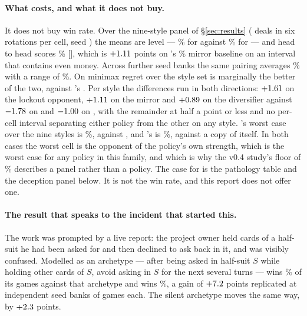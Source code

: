 \paragraph{What \vfive{} costs, and what it does not buy.} It does not buy win
rate. Over the nine-style panel of \S\ref{sec:results}
(\numStyleDeals{} deals in six rotations per cell, seed \numStyleSeed{}) the
means are level --- \numVfiveMean\% for \vfive{} against \numVfourMean\% for
\vfour{} --- and head to head \vfive{} scores \numPanelVfiveVfour\%
[\numStyleCIVfour], which is $+1.11$ points on \vfour{}'s
\numPanelVfourVfour\% mirror baseline on an interval that contains even money.
Across \numHeadSeeds{} further seed banks the same pairing averages \numHeadWin\%
with a range of \numHeadRange\%. On minimax regret over the style set \vfour{} is
marginally the better of the two, \numVfourRegret{} against \vfive{}'s
\numVfiveRegret{}. Per style the differences run in both directions:
$+1.61$ on the lockout opponent, $+1.11$ on the mirror and
$+0.89$ on the diversifier against $-1.78$ on \vtwo{} and
$-1.00$ on \vthree{}, with the remainder at half a point or less and no
per-cell interval separating either policy from the other on any style.
\vfive{}'s worst case over the nine styles is \numVfiveWorst\%, against \vfour{},
and \vfour{}'s is \numVfourWorst\%, against a copy of itself. In both cases the
worst cell is the opponent of the policy's own strength, which is the worst case
for any policy in this family, and which is why the v0.4 study's floor of
\numVfourVsVthree\% describes a panel rather than a policy. The case for \vfive{} is the pathology table and the
deception panel below. It is not the win rate, and this report does not offer
one.

\paragraph{The result that speaks to the incident that started this.} The work
was prompted by a live report: the project owner held cards of a half-suit he
had been asked for and then declined to ask back in it, and \vfour{} was visibly
confused. Modelled as an archetype --- after being asked in half-suit $S$ while
holding other cards of $S$, avoid asking in $S$ for the next several turns ---
\vfour{} wins \numDecWithholderFour\% of its games against that archetype and
\vfive{} wins \numDecWithholderFive\%, a gain of $+7.2$ points
replicated at \numDecSeeds{} independent seed banks of \numDecGames{} games
each. The silent archetype moves the same way, by $+2.3$ points.

